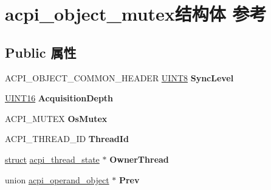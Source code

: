 \hypertarget{structacpi__object__mutex}{}\section{acpi\+\_\+object\+\_\+mutex结构体 参考}
\label{structacpi__object__mutex}
\subsection*{Public 属性}
\begin{DoxyCompactItemize}
\item 
\mbox{\label{structacpi__object__mutex_a0cd21eb9ea702047b836c5b902d2183a}} 
A\+C\+P\+I\+\_\+\+O\+B\+J\+E\+C\+T\+\_\+\+C\+O\+M\+M\+O\+N\+\_\+\+H\+E\+A\+D\+ER \hyperlink{_processor_bind_8h_ab27e9918b538ce9d8ca692479b375b6a}{U\+I\+N\+T8} {\bfseries Sync\+Level}
\item 
\mbox{\label{structacpi__object__mutex_a85fbf2d529d7dfd6c93943e4138c4771}} 
\hyperlink{_processor_bind_8h_a09f1a1fb2293e33483cc8d44aefb1eb1}{U\+I\+N\+T16} {\bfseries Acquisition\+Depth}
\item 
\mbox{\label{structacpi__object__mutex_ac73fdd42e371484651259b23f8424381}} 
A\+C\+P\+I\+\_\+\+M\+U\+T\+EX {\bfseries Os\+Mutex}
\item 
\mbox{\label{structacpi__object__mutex_a86d4579090f612f32727c7eaa4aec582}} 
A\+C\+P\+I\+\_\+\+T\+H\+R\+E\+A\+D\+\_\+\+ID {\bfseries Thread\+Id}
\item 
\mbox{\label{structacpi__object__mutex_a3e42e3d3eae23300f42ec63434c9d813}} 
\hyperlink{interfacestruct}{struct} \hyperlink{structacpi__thread__state}{acpi\+\_\+thread\+\_\+state} $\ast$ {\bfseries Owner\+Thread}
\item 
\mbox{\label{structacpi__object__mutex_a47ed8cd1d9a8ac657e82ea447066987c}} 
union \hyperlink{unionacpi__operand__object}{acpi\+\_\+operand\+\_\+object} $\ast$ {\bfseries Prev}
\item 
\mbox{\label{structacpi__object__mutex_a00927ab53df053418e58d18dcf7c1579}} 

\end{DoxyCompactItemize}
